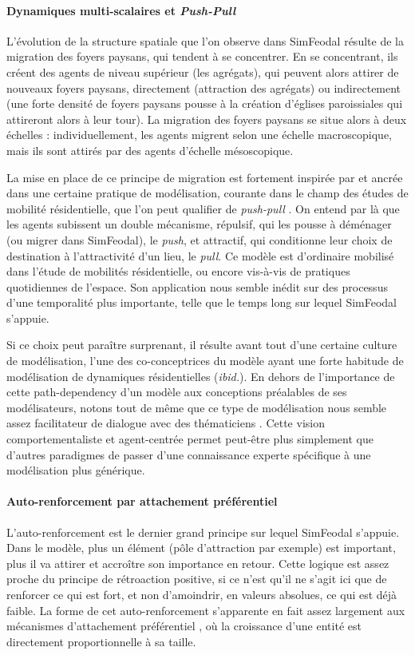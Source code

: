 \paragraph{Dynamiques multi-scalaires et \textit{Push-Pull}}

L'évolution de la structure spatiale que l'on observe dans SimFeodal résulte de la migration des foyers paysans, qui tendent à se concentrer.
En se concentrant, ils créent des agents de niveau supérieur (les agrégats), qui peuvent alors attirer de nouveaux foyers paysans, directement (attraction des agrégats) ou indirectement (une forte densité de foyers paysans pousse à la création d'églises paroissiales qui attireront alors à leur tour).
La migration des foyers paysans se situe alors à deux échelles : individuellement, les agents migrent selon une échelle macroscopique, mais ils sont attirés par des agents d'échelle mésoscopique.

La mise en place de ce principe de migration est fortement inspirée par et ancrée dans une certaine pratique de modélisation, courante dans le champ des études de mobilité résidentielle, que l'on peut qualifier de \og \textit{push-pull}\fg{} \autocite{tannier_analyse_2017}.
On entend par là que les agents subissent un double mécanisme, répulsif, qui les pousse à déménager (ou migrer dans SimFeodal), le \textit{push}, et attractif, qui conditionne leur choix de destination à l'attractivité d'un lieu, le \textit{pull}.
Ce modèle est d'ordinaire mobilisé dans l'étude de mobilités résidentielle, ou encore vis-à-vis de pratiques quotidiennes de l'espace.
Son application nous semble inédit sur des processus d'une temporalité plus importante, telle que le temps long sur lequel SimFeodal s'appuie.

Si ce choix peut paraître surprenant, il résulte avant tout d'une certaine \og culture de modélisation\fg{}, l'une des co-conceptrices du modèle ayant une forte habitude de modélisation de dynamiques résidentielles (\textit{ibid.}).
En dehors de l'importance de cette \og path-dependency\fg{} d'un modèle aux conceptions préalables de ses modélisateurs, notons tout de même que ce type de modélisation nous semble assez facilitateur de dialogue avec des thématiciens .
Cette vision \og comportementaliste\fg{} et agent-centrée permet peut-être plus simplement que d'autres paradigmes de passer d'une connaissance experte spécifique à une modélisation plus générique.

\paragraph{Auto-renforcement par attachement préférentiel}
L'auto-renforcement est le dernier grand principe sur lequel SimFeodal s'appuie.
Dans le modèle, plus un élément (pôle d'attraction par exemple) est important, plus il va attirer et accroître son importance en retour.
Cette logique est assez proche du principe de rétroaction positive, si ce n'est qu'il ne s'agit ici que de renforcer ce qui est fort, et non d'amoindrir, en valeurs absolues, ce qui est déjà faible.
La forme de cet auto-renforcement s'apparente en fait assez largement aux mécanismes d'attachement préférentiel \autocite{barabasi_emergence_1999}, où la croissance d'une entité est directement proportionnelle à sa taille.

